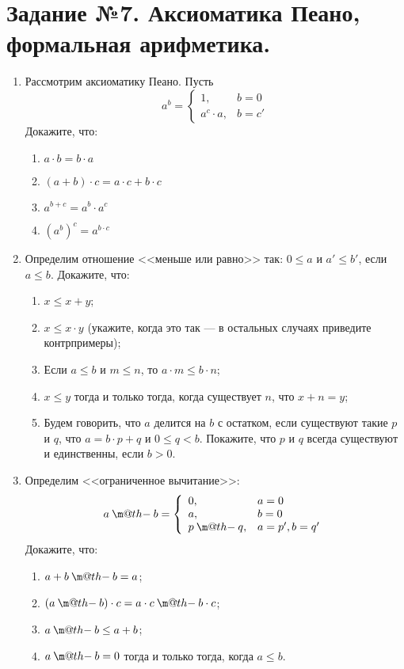 \documentclass[10pt,a4paper,oneside]{article}
\makeatletter
\newcommand{\dotminus}{\mathbin{\text{\@dotminus}}}
\newcommand{\@dotminus}{%
  \ooalign{\hidewidth\raise1ex\hbox{.}\hidewidth\cr$\m@th-$\cr}%
}
\makeatother
\begin{document}
\section*{Задание №7. Аксиоматика Пеано, формальная арифметика.}
\begin{enumerate}
\item Рассмотрим аксиоматику Пеано. 
Пусть $$a^b = \left\{\begin{array}{ll}1,& b= 0 \\a^c\cdot a,&b = c'\end{array}\right.$$
Докажите, что:
\begin{enumerate}
\item $a \cdot b = b \cdot a$
\item $(a + b) \cdot c = a \cdot c + b \cdot c$
\item $a^{b+c} = a^b \cdot a^c$
\item $(a^b)^c = a^{b \cdot c}$
\end{enumerate}

\item Определим отношение <<меньше или равно>> так: $0 \le a$ и $a' \le b'$, если $a \le b$. Докажите, что:
\begin{enumerate}
\item $x \le x+y$;
\item $x \le x \cdot y$ (укажите, когда это так --- в остальных случаях приведите контрпримеры);
\item Если $a \le b$ и $m \le n$, то $a \cdot m \le b \cdot n$;
\item $x \le y$ тогда и только тогда, когда существует $n$, что $x + n = y$;
\item Будем говорить, что $a$ делится на $b$ с остатком, если существуют такие $p$ и $q$, что 
$a = b \cdot p + q$ и $0 \le q < b$. Покажите, что $p$ и $q$ всегда существуют и единственны,
если $b > 0$.
\end{enumerate}

\item Определим <<ограниченное вычитание>>: $$a \dotminus b = \left\{\begin{array}{ll}0, & a = 0\\a, & b = 0\\p \dotminus q, & a = p', b = q'\end{array}\right.$$
Докажите, что:
\begin{enumerate}
\item $a + b \dotminus b = a$;
\item $(a \dotminus b) \cdot c = a \cdot c \dotminus b \cdot c$;
\item $a \dotminus b \le a + b$;
\item $a \dotminus b = 0$ тогда и только тогда, когда $a \le b$.
\end{enumerate}


\end{enumerate}
\end{document}
